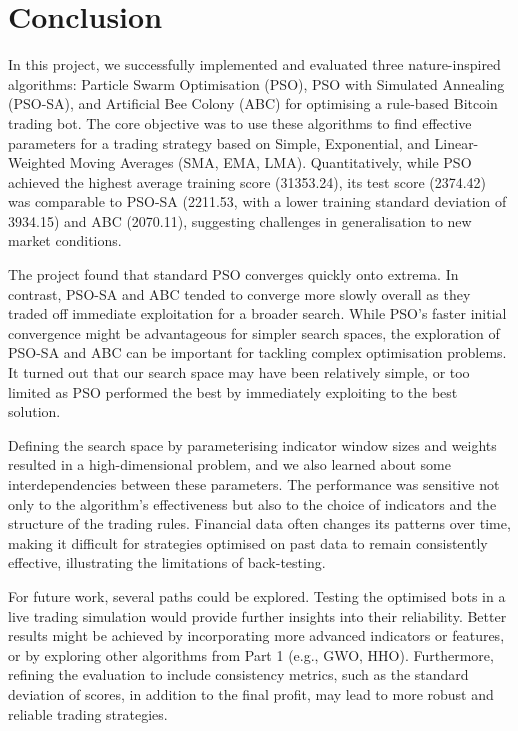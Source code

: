 \documentclass[a4paper, 12pt]{extarticle}
\begin{document}
\newpage
\section{Conclusion}
In this project, we successfully implemented and evaluated three nature-inspired algorithms: Particle Swarm Optimisation (PSO), PSO with Simulated Annealing (PSO-SA), and Artificial Bee Colony (ABC) for optimising a rule-based Bitcoin trading bot. The core objective was to use these algorithms to find effective parameters for a trading strategy based on Simple, Exponential, and Linear-Weighted Moving Averages (SMA, EMA, LMA). Quantitatively, while PSO achieved the highest average training score (31353.24), its test score (2374.42) was comparable to PSO-SA (2211.53, with a lower training standard deviation of 3934.15) and ABC (2070.11), suggesting challenges in generalisation to new market conditions.

The project found that standard PSO converges quickly onto extrema. In contrast, PSO-SA and ABC tended to converge more slowly overall as they traded off immediate exploitation for a broader search. While PSO's faster initial convergence might be advantageous for simpler search spaces, the exploration of PSO-SA and ABC can be important for tackling complex optimisation problems. It turned out that our search space may have been relatively simple, or too limited as PSO performed the best by immediately exploiting to the best solution.

Defining the search space by parameterising indicator window sizes and weights resulted in a high-dimensional problem, and we also learned about some interdependencies between these parameters. The performance was sensitive not only to the algorithm's effectiveness but also to the choice of indicators and the structure of the trading rules. Financial data often changes its patterns over time, making it difficult for strategies optimised on past data to remain consistently effective, illustrating the limitations of back-testing.

For future work, several paths could be explored. Testing the optimised bots in a live trading simulation would provide further insights into their reliability. Better results might be achieved by incorporating more advanced indicators or features, or by exploring other algorithms from Part 1 (e.g., GWO, HHO). Furthermore, refining the evaluation to include consistency metrics, such as the standard deviation of scores, in addition to the final profit, may lead to more robust and reliable trading strategies. 
\end{document}
